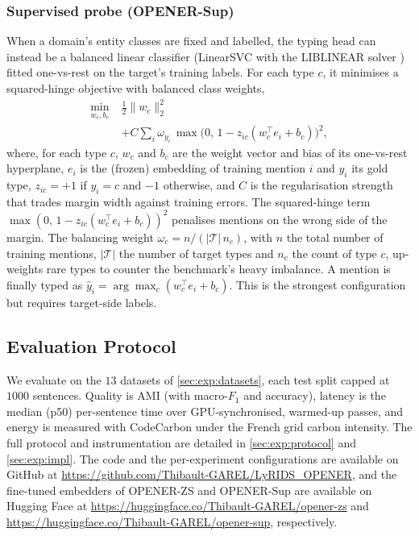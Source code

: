 \documentclass[pdflatex,sn-basic,Numbered]{sn-jnl}
\begin{document}
\subsubsection{Supervised probe (OPENER-Sup)}
When a domain's entity classes are fixed and labelled, the typing head can instead be a balanced linear classifier (LinearSVC with the LIBLINEAR solver \cite{fan2008liblinear}) fitted one-vs-rest on the target's training labels.
For each type $c$, it minimises a squared-hinge objective with balanced class weights,
\begin{equation}
\begin{split}
\min_{w_c,b_c}\;&\tfrac12\lVert w_c\rVert_2^2\\
&+C\sum_i \omega_{y_i}\,\max\!\big(0,\,1-z_{ic}(w_c^{\top} e_i+b_c)\big)^2,
\end{split}
\end{equation}
where, for each type $c$, $w_c$ and $b_c$ are the weight vector and bias of its one-vs-rest hyperplane, $e_i$ is the (frozen) embedding of training mention $i$ and $y_i$ its gold type, $z_{ic}{=}{+}1$ if $y_i{=}c$ and ${-}1$ otherwise, and $C$ is the regularisation strength that trades margin width against training errors. The squared-hinge term $\max(0,\,1-z_{ic}(w_c^{\top}e_i+b_c))^2$ penalises mentions on the wrong side of the margin. The balancing weight $\omega_c=n/(|\mathcal{T}|\,n_c)$, with $n$ the total number of training mentions, $|\mathcal{T}|$ the number of target types and $n_c$ the count of type $c$, up-weights rare types to counter the benchmark's heavy imbalance. A mention is finally typed as $\hat y_i=\arg\max_c (w_c^{\top}e_i+b_c)$.
This is the strongest configuration but requires target-side labels.

\subsection{Evaluation Protocol}
\label{sec:method:eval}
We evaluate on the $13$ datasets of \autoref{sec:exp:datasets}, each test split capped at $1000$ sentences.
Quality is AMI \cite{vinh2010ami} (with macro-$F_1$ and accuracy), latency is the median (p50) per-sentence time over GPU-synchronised, warmed-up passes, and energy is measured with CodeCarbon \cite{luccioni2019quantifying} under the French grid carbon intensity. The full protocol and instrumentation are detailed in \autoref{sec:exp:protocol} and \autoref{sec:exp:impl}.
The code and the per-experiment configurations are available on GitHub at \url{https://github.com/Thibault-GAREL/LyRIDS_OPENER}, and the fine-tuned embedders of OPENER-ZS and OPENER-Sup are available on Hugging Face at \url{https://huggingface.co/Thibault-GAREL/opener-zs} and \url{https://huggingface.co/Thibault-GAREL/opener-sup}, respectively.
\end{document}
